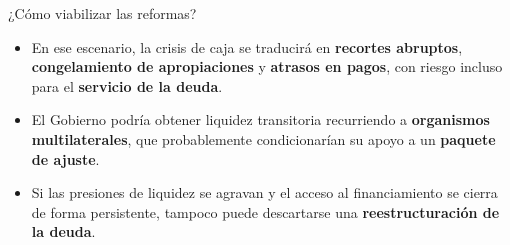 \begin{frame}{¿Cómo viabilizar las reformas?}
    \begin{itemize}
        \item En ese escenario, la crisis de caja se traducirá en \textbf{recortes abruptos}, \textbf{congelamiento de apropiaciones} y \textbf{atrasos en pagos}, con riesgo incluso para el \textbf{servicio de la deuda}.
        \item El Gobierno podría obtener liquidez transitoria recurriendo a \textbf{organismos multilaterales}, que probablemente condicionarían su apoyo a un \textbf{paquete de ajuste}.
        \item Si las presiones de liquidez se agravan y el acceso al financiamiento se cierra de forma persistente, tampoco puede descartarse una \textbf{reestructuración de la deuda}.
    \end{itemize}
\end{frame}


